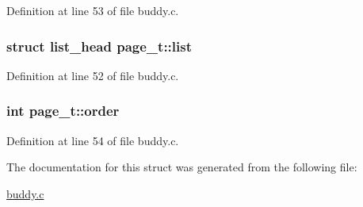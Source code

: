 Definition at line 53 of file buddy.\+c.

\subsubsection[{\texorpdfstring{list}{list}}]{\setlength{\rightskip}{0pt plus 5cm}struct {\bf list\+\_\+head} page\+\_\+t\+::list}\hypertarget{structpage__t_a97306c6fff4f6280e8e8049412091475}{}\label{structpage__t_a97306c6fff4f6280e8e8049412091475}


Definition at line 52 of file buddy.\+c.

\subsubsection[{\texorpdfstring{order}{order}}]{\setlength{\rightskip}{0pt plus 5cm}int page\+\_\+t\+::order}\hypertarget{structpage__t_aeb4724e8b59033b5373a965e16ce86ad}{}\label{structpage__t_aeb4724e8b59033b5373a965e16ce86ad}


Definition at line 54 of file buddy.\+c.



The documentation for this struct was generated from the following file\+:\begin{DoxyCompactItemize}
\item 
\hyperlink{buddy_8c}{buddy.\+c}\end{DoxyCompactItemize}
